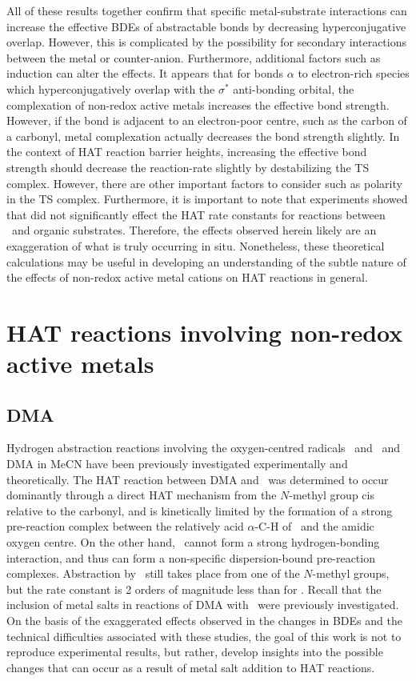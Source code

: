All of these results together confirm that specific metal-substrate
interactions can increase the effective BDEs of abstractable  bonds by
decreasing hyperconjugative overlap. However, this is complicated by the
possibility for secondary interactions between the metal or counter-anion.
Furthermore, additional factors such as induction can alter the effects. It
appears that for  bonds $\alpha$ to electron-rich species which
hyperconjugatively overlap with the $\sigma^*$ anti-bonding orbital, the
complexation of non-redox active metals increases the effective  bond
strength. However, if the  bond is adjacent to an electron-poor centre,
such as the carbon of a carbonyl, metal complexation actually decreases the
bond strength slightly. In the context of HAT reaction barrier heights,
increasing the effective  bond strength should decrease the
reaction-rate slightly by destabilizing the TS complex. However, there are
other important factors to consider such as polarity in the TS complex.
Furthermore, it is important to note that experiments showed that 
did not significantly effect the HAT rate constants for reactions between
\cumo\ and organic substrates. Therefore, the effects observed herein likely
are an exaggeration of what is truly occurring in situ. Nonetheless, these
theoretical calculations may be useful in developing an understanding of the
subtle nature of the effects of non-redox active metal cations on HAT reactions
in general.

\section{HAT reactions involving non-redox active metals}

\subsection{DMA}

Hydrogen abstraction reactions involving the oxygen-centred radicals \bno\ and
\cumo\ and DMA in MeCN have been previously investigated experimentally and
theoretically.\cite{Salamone2013} The HAT reaction between DMA and \bno\ was
determined to occur dominantly through a direct HAT mechanism from the
$N$-methyl group cis relative to the carbonyl, and is kinetically limited by
the formation of a strong pre-reaction complex between the relatively acid
$\alpha$-C-H of \bno\ and the amidic oxygen centre. On the other hand, \cumo\
cannot form a strong hydrogen-bonding interaction, and thus can form a
non-specific dispersion-bound pre-reaction complexes. Abstraction by \cumo\
still takes place from one of the $N$-methyl groups, but the rate constant is 2
orders of magnitude less than for \bno. Recall that the inclusion of metal
salts in reactions of DMA with \cumo\ were previously
investigated.\cite{Salamone2015metals} On the basis of the exaggerated effects
observed in the changes in BDEs and the technical difficulties associated with
these studies, the goal of this work is not to reproduce experimental results,
but rather, develop insights into the possible changes that can occur as a
result of metal salt addition to HAT reactions.

